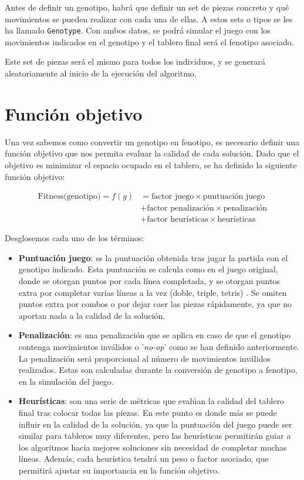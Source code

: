 \documentclass[11pt,spanish,listoffigures,listoftables]{tfgetsinf}
\begin{document}
Antes de definir un genotipo, habrá que definir un set de piezas concreto y qué movimientos se pueden realizar con cada una de ellas. A estos sets o tipos se les ha llamado \texttt{Genotype}. Con ambos datos, se podrá simular el juego con los movimientos indicados en el genotipo y el tablero final será el fenotipo asociado.

Este set de piezas será el mismo para todos los individuos, y se generará aleatoriamente al inicio de la ejecución del algoritmo. 

\section{Función objetivo}
Una vez sabemos como convertir un genotipo en fenotipo, es necesario definir una función objetivo que nos permita evaluar la calidad de cada solución. Dado que el objetivo es minimizar el espacio ocupado en el tablero, se ha definido la siguiente función objetivo:

\begin{align*}
\text{Fitness(genotipo)} = f(g) &= \text{factor juego}\times\text{puntuación juego} \\
&+ \text{factor penalización}\times\text{penalización} \\
&+ \text{factor heurísticas}\times\text{heurísticas}
\end{align*}

Desglosemos cada uno de los términos:
\begin{itemize}
    \item \textbf{Puntuación juego}: es la puntuación obtenida tras jugar la partida con el genotipo indicado. Esta puntuación se calcula como en el juego original, donde se otorgan puntos por cada línea completada, y se otorgan puntos extra por completar varias líneas a la vez (doble, triple, tetris) \cite{}. Se omiten puntos extra por combos o por dejar caer las piezas rápidamente, ya que no aportan nada a la calidad de la solución.
    
    \item \textbf{Penalización}: es una penalización que se aplica en caso de que el genotipo contenga movimientos inválidos o '\textit{no-op}' como se han definido anteriormente. La penalización será proporcional al número de movimientos inválidos realizados. Estas son calculadas durante la conversión de genotipo a fenotipo, en la simulación del juego.
    
    \item \textbf{Heurísticas}: son una serie de métricas que evalúan la calidad del tablero final tras colocar todas las piezas. En este punto es donde más se puede influir en la calidad de la solución, ya que la puntuación del juego puede ser similar para tableros muy diferentes, pero las heurísticas permitirán guiar a los algoritmos hacia mejores soluciones sin necesidad de completar muchas líneas. Además, cada heurística tendrá un peso o factor asociado, que permitirá ajustar su importancia en la función objetivo. 
\end{itemize}
\end{document}

